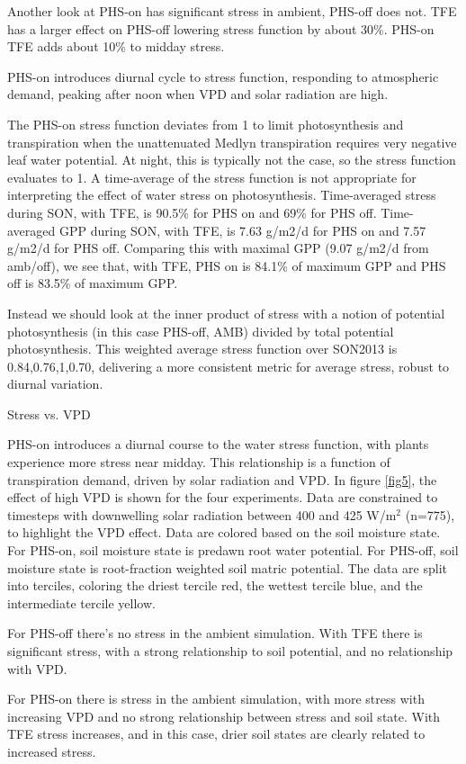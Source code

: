 \documentclass[draft,linenumbers]{agujournal}
\begin{document}
Another look at PHS-on has significant stress in ambient, PHS-off does not.
TFE has a larger effect on PHS-off lowering stress function by about 30\%.
PHS-on TFE adds about 10\% to midday stress.

PHS-on introduces diurnal cycle to stress function, responding to atmospheric demand, peaking after noon
when VPD and solar radiation are high. 

The PHS-on stress function deviates from 1 to limit photosynthesis and transpiration when the unattenuated Medlyn transpiration requires
very negative leaf water potential. At night, this is typically not the case, so the stress function evaluates to 1. 
A time-average of the stress function is not appropriate for interpreting the effect of water stress on photosynthesis.
Time-averaged stress during SON, with TFE, is 90.5\% for PHS on and 69\% for PHS off.
Time-averaged GPP during SON,  with TFE, is 7.63 g/m2/d for PHS on and 7.57 g/m2/d for PHS off.
Comparing this with maximal GPP (9.07 g/m2/d from amb/off), we see that,
with TFE, PHS on is 84.1\% of maximum GPP and PHS off is 83.5\% of maximum GPP.

Instead we should look at the inner product of stress with a notion of potential photosynthesis (in this case PHS-off, AMB) divided by total potential photosynthesis.
This weighted average stress function over SON2013 is 0.84,0.76,1,0.70, delivering a more consistent metric for average stress, robust to diurnal variation.

Stress vs. VPD

PHS-on introduces a diurnal course to the water stress function, with plants experience more stress near midday. This relationship is a function of transpiration demand, driven by solar radiation and VPD. In figure \ref{fig5}, the effect of high VPD is shown for the four experiments. Data are constrained to timesteps with downwelling solar radiation between 400 and 425 W/m$^2$ (n=775), to highlight the VPD effect. Data are colored based on the soil moisture state. For PHS-on, soil moisture state is predawn root water potential. For PHS-off, soil moisture state is root-fraction weighted soil matric potential. The data are split into terciles, coloring the driest tercile red, the wettest tercile blue, and the intermediate tercile yellow.

For PHS-off there's no stress in the ambient simulation. 
With TFE there is significant stress, with a strong relationship to soil potential, and no relationship with VPD. 

For PHS-on there is stress in the ambient simulation, with more stress with increasing VPD
and no strong relationship between stress and soil state.
With TFE stress increases, and in this case, drier soil states are clearly related to increased stress.
\end{document}
